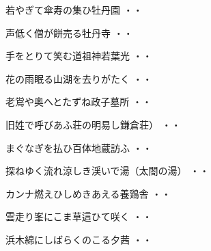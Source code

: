 \vspace{0.6cm}
\begin{shiika}若やぎて傘寿の集ひ牡丹園
\hfill{・・}\end{shiika}
\vspace{0.6cm}
\begin{shiika}声低く僧が餅売る牡丹寺
\hfill{・・}\end{shiika}
\vspace{0.6cm}
\begin{shiika}手をとりて笑む道祖神若葉光
\hfill{・・}\end{shiika}
\vspace{0.6cm}
\begin{shiika}花の雨眠る山湖を去りがたく
\hfill{・・}\end{shiika}
\vspace{0.6cm}
\begin{shiika}老鴬や奥へとたずね政子墓所
\hfill{・・}\end{shiika}
\vspace{0.6cm}
\begin{shiika}旧姓で呼びあふ荘の明易し鎌倉荘）
\hfill{・・}\end{shiika}
\vspace{0.6cm}
\begin{shiika}まぐなぎを払ひ百体地蔵訪ふ
\hfill{・・}\end{shiika}
\vspace{0.6cm}
\begin{shiika}探ねゆく流れ涼しき渓いで湯（太閤の湯）
\hfill{・・}\end{shiika}
\vspace{0.6cm}
\begin{shiika}カンナ燃えひしめきあえる養鶏舎
\hfill{・・}\end{shiika}
\vspace{0.6cm}
\begin{shiika}雲走り峯にこま草這ひて咲く
\hfill{・・}\end{shiika}
\vspace{0.6cm}
\begin{shiika}浜木綿にしばらくのこる夕茜
\hfill{・・}\end{shiika}
